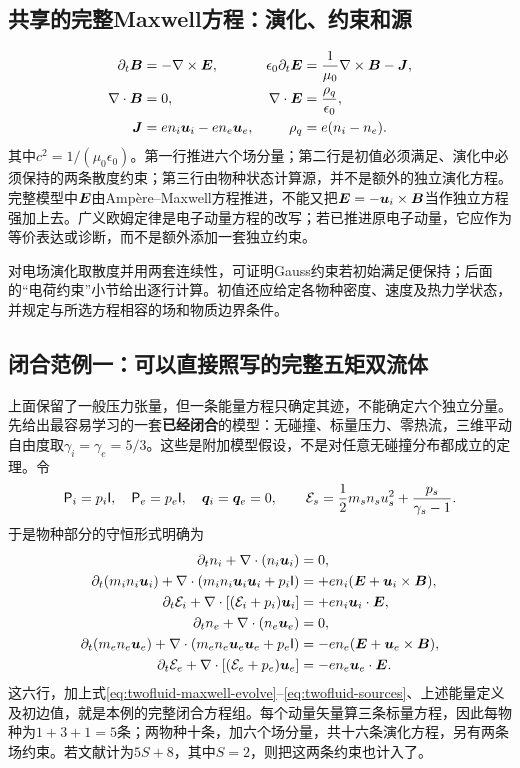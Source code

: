 \documentclass[UTF8,a4paper,11pt,openany,fontset=fandol]{ctexbook}
\begin{document}
\subsection{共享的完整Maxwell方程：演化、约束和源}
\begin{align}
 \partial_t\bm{B}&=-\nabla\times\bm{E},
 &\epsilon_0\partial_t\bm{E}&=\frac1{\mu_0}\nabla\times\bm{B}-\bm{J},
 \label{eq:twofluid-maxwell-evolve}\\
 \nabla\cdot\bm{B}&=0,
 &\nabla\cdot\bm{E}&=\frac{\rho_q}{\epsilon_0},
 \label{eq:twofluid-maxwell-constraints}\\
 \bm{J}&=en_i\bm{u}_i-en_e\bm{u}_e,
 &\rho_q&=e(n_i-n_e).
 \label{eq:twofluid-sources}
\end{align}
其中$c^2=1/(\mu_0\epsilon_0)$。第一行推进六个场分量；第二行是初值必须满足、演化中必须保持的两条散度约束；第三行由物种状态计算源，并不是额外的独立演化方程。
完整模型中$\bm{E}$由Ampère--Maxwell方程推进，不能又把$\bm{E}=-\bm{u}_i\times\bm{B}$当作独立方程强加上去。广义欧姆定律是电子动量方程的改写；若已推进原电子动量，它应作为等价表达或诊断，而不是额外添加一套独立约束。

对电场演化取散度并用两套连续性，可证明Gauss约束若初始满足便保持；后面的“电荷约束”小节给出逐行计算。初值还应给定各物种密度、速度及热力学状态，并规定与所选方程相容的场和物质边界条件。

\subsection{闭合范例一：可以直接照写的完整五矩双流体}
\label{sec:full-five-moment}
上面保留了一般压力张量，但一条能量方程只确定其迹，不能确定六个独立分量。先给出最容易学习的一套\textbf{已经闭合}的模型：无碰撞、标量压力、零热流，三维平动自由度取$\gamma_i=\gamma_e=5/3$。这些是附加模型假设，不是对任意无碰撞分布都成立的定理。令
\begin{equation}
 \mathsf P_i=p_i\mathsf I,\quad \mathsf P_e=p_e\mathsf I,\quad
 \bm{q}_i=\bm{q}_e=0,\qquad
 \mathcal E_s=\frac12m_sn_su_s^2+\frac{p_s}{\gamma_s-1}.
\end{equation}
于是物种部分的守恒形式明确为
\begin{align}
 \partial_t n_i+\nabla\cdot(n_i\bm{u}_i)&=0,\\
 \partial_t(m_in_i\bm{u}_i)+\nabla\cdot(m_in_i\bm{u}_i\bm{u}_i+p_i\mathsf I)
 &=+en_i(\bm{E}+\bm{u}_i\times\bm{B}),\\
 \partial_t\mathcal E_i+\nabla\cdot[(\mathcal E_i+p_i)\bm{u}_i]
 &=+en_i\bm{u}_i\cdot\bm{E},\\
 \partial_t n_e+\nabla\cdot(n_e\bm{u}_e)&=0,\\
 \partial_t(m_en_e\bm{u}_e)+\nabla\cdot(m_en_e\bm{u}_e\bm{u}_e+p_e\mathsf I)
 &=-en_e(\bm{E}+\bm{u}_e\times\bm{B}),\\
 \partial_t\mathcal E_e+\nabla\cdot[(\mathcal E_e+p_e)\bm{u}_e]
 &=-en_e\bm{u}_e\cdot\bm{E}.
 \label{eq:closed-five-species}
\end{align}
这六行，加上式\eqref{eq:twofluid-maxwell-evolve}--\eqref{eq:twofluid-sources}、上述能量定义及初边值，就是本例的完整闭合方程组。每个动量矢量算三条标量方程，因此每物种为$1+3+1=5$条；两物种十条，加六个场分量，共十六条演化方程，另有两条场约束。若文献计为$5S+8$，其中$S=2$，则把这两条约束也计入了。
\end{document}
